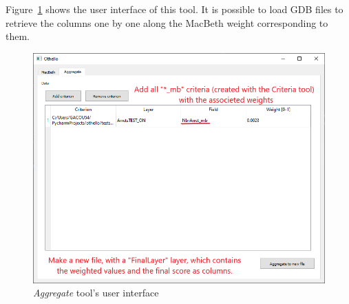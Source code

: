 \documentclass[11pt]{article}
\begin{document}
Figure\ \ref{fig:aggregate-ui} shows the user interface of this tool.
It is possible to load GDB files to retrieve the columns one
by one along the MacBeth weight corresponding to them.

\begin{figure}[H]
    \centering
    \includegraphics[width=.8\linewidth]{../images/aggregate_tool.png}
    \caption{\textit{Aggregate} tool's user interface}
\label{fig:aggregate-ui}

\end{figure}
\end{document}
